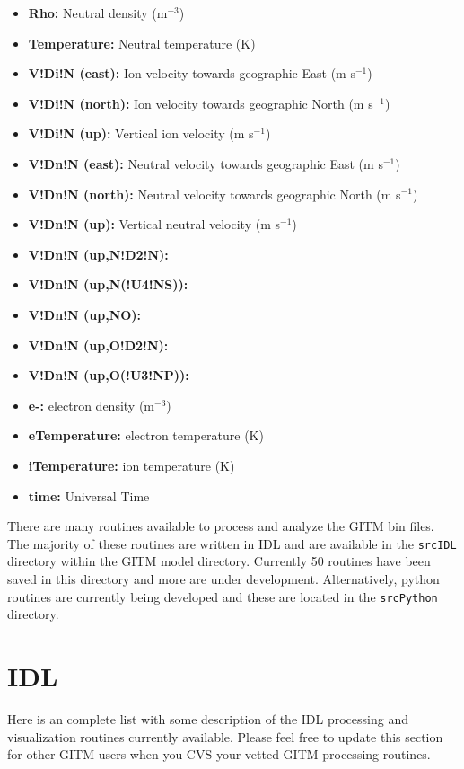 \begin{itemize}
\item[]{\bf Rho:} Neutral density (m$^{-3}$)
\item[]{\bf Temperature:} Neutral temperature (K)
\item[]{\bf V!Di!N (east):} Ion velocity towards geographic East (m s$^{-1}$)
\item[]{\bf V!Di!N (north):} Ion velocity towards geographic North (m s$^{-1}$) 
\item[]{\bf V!Di!N (up):} Vertical ion velocity (m s$^{-1}$)
\item[]{\bf V!Dn!N (east):} Neutral velocity towards geographic East (m s$^{-1}$)
\item[]{\bf V!Dn!N (north):} Neutral velocity towards geographic North (m s$^{-1}$)
\item[]{\bf V!Dn!N (up):} Vertical neutral velocity (m s$^{-1}$)
\item[]{\bf V!Dn!N (up,N!D2!N):}
\item[]{\bf V!Dn!N (up,N(!U4!NS)):}
\item[]{\bf V!Dn!N (up,NO):}
\item[]{\bf V!Dn!N (up,O!D2!N):}
\item[]{\bf V!Dn!N (up,O(!U3!NP)):}
\item[]{\bf e-:} electron density (m$^{-3}$)
\item[]{\bf eTemperature:} electron temperature (K)
\item[]{\bf iTemperature:} ion temperature (K)
\item[]{\bf time:} Universal Time
\end{itemize}

There are many routines available to process and analyze the GITM bin files.  The majority of these routines are written in IDL and are available in the {\tt srcIDL} directory within the GITM model directory.  Currently 50 routines have been saved in this directory and more are under development.  Alternatively, python routines are currently being developed and these are located in the {\tt srcPython} directory.

\section{IDL}
\label{idl.sec}

Here is an complete list with some description of the IDL processing and visualization routines currently available.  Please feel free to update this section for other GITM users when you CVS your vetted GITM processing routines.
 
